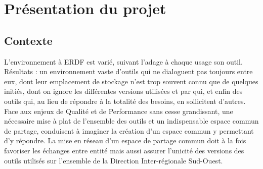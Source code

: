 \chapter{Présentation du projet} %

\label{Chapter2} %

\section{Contexte}
L'environnement à ERDF est varié, suivant l'adage à chaque usage son outil.
Résultats : un environnement vaste d'outils qui ne dialoguent pas toujours entre eux, dont leur
emplacement de stockage n'est trop souvent connu que de quelques initiés, dont on ignore les
différentes versions utilisées et par qui, et enfin des outils qui, au lieu de répondre à la totalité des
besoins, en sollicitent d'autres.
Face aux enjeux de Qualité et de Performance sans cesse grandissant, une nécessaire mise à plat de
l'ensemble des outils et un indispensable espace commun de partage, conduisent à imaginer la
création d'un espace commun y permettant d'y répondre.
La mise en réseau d'un espace de partage commun doit à la fois favoriser les échanges entre entité
mais aussi assurer l'unicité des versions des outils utilisés sur l'ensemble de la Direction
Inter-régionale Sud-Ouest.
